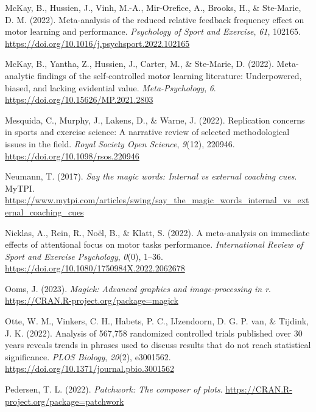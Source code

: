 \documentclass[
  man, donotrepeattitle,floatsintext]{apa7}
\newlength{\cslhangindent}
\newlength{\cslentryspacingunit} %
\newenvironment{CSLReferences}[2] %
 {%
  \setlength{\parindent}{0pt}
  \ifodd #1
  \let\oldpar\par
  \def\par{\hangindent=\cslhangindent\oldpar}
  \fi
  \setlength{\parskip}{#2\cslentryspacingunit}
 }%
 {}
\begin{document}
\begin{CSLReferences}{1}{0}
\leavevmode{}%
McKay, B., Hussien, J., Vinh, M.-A., Mir-Orefice, A., Brooks, H., \& Ste-Marie, D. M. (2022). Meta-analysis of the reduced relative feedback frequency effect on motor learning and performance. \emph{Psychology of Sport and Exercise}, \emph{61}, 102165. \url{https://doi.org/10.1016/j.psychsport.2022.102165}

\leavevmode{}%
McKay, B., Yantha, Z., Hussien, J., Carter, M., \& Ste-Marie, D. (2022). Meta-analytic findings of the self-controlled motor learning literature: {Underpowered}, biased, and lacking evidential value. \emph{Meta-Psychology}, \emph{6}. \url{https://doi.org/10.15626/MP.2021.2803}

\leavevmode{}%
Mesquida, C., Murphy, J., Lakens, D., \& Warne, J. (2022). Replication concerns in sports and exercise science: A narrative review of selected methodological issues in the field. \emph{Royal Society Open Science}, \emph{9}(12), 220946. \url{https://doi.org/10.1098/rsos.220946}

\leavevmode{}%
Neumann, T. (2017). \emph{Say the magic words: {Internal} vs external coaching cues}. {MyTPI}. \url{https://www.mytpi.com/articles/swing/say_the_magic_words_internal_vs_external_coaching_cues}

\leavevmode{}%
Nicklas, A., Rein, R., Noël, B., \& Klatt, S. (2022). A meta-analysis on immediate effects of attentional focus on motor tasks performance. \emph{International Review of Sport and Exercise Psychology}, \emph{0}(0), 1--36. \url{https://doi.org/10.1080/1750984X.2022.2062678}

\leavevmode{}%
Ooms, J. (2023). \emph{Magick: Advanced graphics and image-processing in r}. \url{https://CRAN.R-project.org/package=magick}

\leavevmode{}%
Otte, W. M., Vinkers, C. H., Habets, P. C., IJzendoorn, D. G. P. van, \& Tijdink, J. K. (2022). Analysis of 567,758 randomized controlled trials published over 30 years reveals trends in phrases used to discuss results that do not reach statistical significance. \emph{PLOS Biology}, \emph{20}(2), e3001562. \url{https://doi.org/10.1371/journal.pbio.3001562}

\leavevmode{}%
Pedersen, T. L. (2022). \emph{Patchwork: The composer of plots}. \url{https://CRAN.R-project.org/package=patchwork}


\end{CSLReferences}
\end{document}
